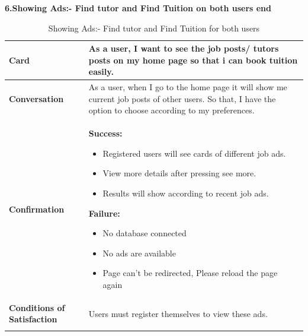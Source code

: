 \textbf{6.Showing Ads:- Find tutor and Find Tuition on both users end}
\begin{center}
\setlength{\tabcolsep}{0.8cm}
\renewcommand{\arraystretch}{1.2}
        \centering
        \begin{longtable}{|m{70pt}|p{9cm}|}
            \hline
                \textbf{Card} &
                    As a user, I want to see the job posts/ tutors posts on my home page so that i can book tuition easily.\\
            \hline
                \textbf{Conversation} &
                    As a user, when I go to the home page it will show me current job posts of other users. So that, I have the option to choose according to my preferences.  \\
            \hline
                \textbf{Confirmation} &
                     \textbf{ Success:}
                        \begin{itemize}
                            \item   Registered users will see cards of different job ads.
                            \item View more details after pressing see more. 
                            \item Results will show according to recent job ads. 
                        \end{itemize}
                    \textbf{Failure:}
                        \begin{itemize}
                            \item No database connected
                            \item No ads are available
                            \item Page can't be redirected, Please reload the page again
                        \end{itemize}\\
            \hline
                \textbf{Conditions of Satisfaction} &  
                    Users must register themselves to view these ads. \\
            \hline
        \caption{Showing Ads:- Find tutor and Find Tuition for both users}
        \label{tab:my_label}
        \end{longtable}
\end{center}

